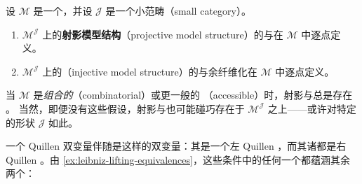 \begin{definition}\label{def:projective-injective-model-structures}
设 $\mathcal{M}$ 是一个\trModelCategory，并设 $\mathcal{J}$ 是一个小范畴（small
category）。
\begin{enumerate}[label=(\roman*)]
\item $\mathcal{M}^{\mathcal{J}}$ 上的\textbf{射影模型结构}（projective model
  structure）的\trWeakEquivalence{}与\trFibration{}在 $\mathcal{M}$ 中逐点定义。
\item $\mathcal{M}^{\mathcal{J}}$ 上的\textbf{\trInjectiveModelStructure}（injective model
  structure）的\trWeakEquivalence{}与余纤维化在 $\mathcal{M}$ 中逐点定义。
\end{enumerate}
\end{definition}

当\trModelCategory{} $\mathcal{M}$ 是\emph{组合的}（combinatorial）或更一般的%
\emph{\trAccessible}（accessible）时，射影与\trInjectiveModelStructure{}总是存在 \cite{bib54}。
当然，即便没有这些假设，射影与\trInjectiveModelStructure{}也可能碰巧存在于
$\mathcal{M}^{\mathcal{J}}$ 之上——或许对特定的\trDiagram{}形状 $\mathcal{J}$
如此。

一个 Quillen 双变量伴随是这样的双变量\trAdjunction：其\trLeftAdjoint{}是一个左
Quillen \trBifunctor，而其诸\trRightAdjoint{}都是右 Quillen \trBifunctor。由%
\cref{ex:leibniz-lifting-equivalences}，这些条件中的任何一个都蕴涵其余两个：

